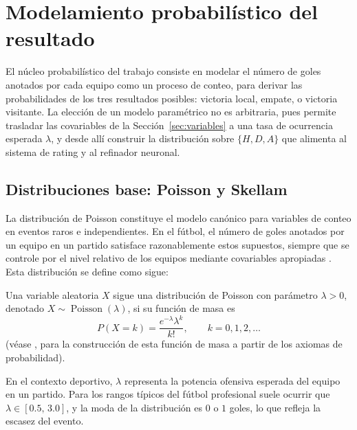 
\section{Modelamiento probabil\'istico del resultado}
\label{sec:modelo_probabilistico}

El n\'ucleo probabil\'istico del trabajo consiste en modelar el n\'umero de goles anotados por cada equipo como un proceso de conteo, para derivar las probabilidades de los tres resultados posibles: victoria local, empate, o victoria visitante. La elecci\'on de un modelo param\'etrico no es arbitraria, pues permite trasladar las covariables de la Secci\'on~\ref{sec:variables} a una tasa de ocurrencia esperada $\lambda$, y desde all\'i construir la distribuci\'on sobre $\{H, D, A\}$ que alimenta al sistema de rating y al refinador neuronal.

\subsection{Distribuciones base: Poisson y Skellam}
\label{subsec:poisson}
\label{subsec:skellam}

La distribuci\'on de Poisson constituye el modelo can\'onico para variables de conteo en eventos raros e independientes. En el f\'utbol, el n\'umero de goles anotados por un equipo en un partido satisface razonablemente estos supuestos, siempre que se controle por el nivel relativo de los equipos mediante covariables apropiadas \cite{maher1982}. Esta distribuci\'on se define como sigue:

\begin{definition}
	Una variable aleatoria $X$ sigue una distribuci\'on de Poisson con par\'ametro $\lambda > 0$, denotado $X \sim \operatorname{Poisson}(\lambda)$, si su funci\'on de masa es
	\begin{equation}\label{eq:poisson_pmf}
		P(X = k) = \frac{e^{-\lambda} \lambda^{k}}{k!}, \qquad k = 0, 1, 2, \dots
	\end{equation}
	(v\'ease \cite{arriojas2004}, para la construcci\'on de esta funci\'on de masa a partir de los axiomas de probabilidad).
\end{definition}

En el contexto deportivo, $\lambda$ representa la potencia ofensiva esperada del equipo en un partido. Para los rangos t\'ipicos del f\'utbol profesional suele ocurrir que $\lambda \in [0{.}5,\,3{.}0]$, y la moda de la distribuci\'on es $0$ o $1$ goles, lo que refleja la escasez del evento. 

